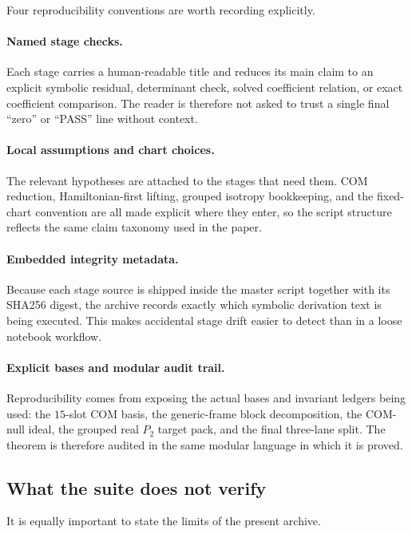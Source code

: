 \documentclass[11pt]{article}
\begin{document}
Four reproducibility conventions are worth recording explicitly.

\paragraph{Named stage checks.}
Each stage carries a human-readable title and reduces its main claim to an
explicit symbolic residual, determinant check, solved coefficient relation, or
exact coefficient comparison.  The reader is therefore not asked to trust a
single final ``zero'' or ``PASS'' line without context.

\paragraph{Local assumptions and chart choices.}
The relevant hypotheses are attached to the stages that need them.  COM
reduction, Hamiltonian-first lifting, grouped isotropy bookkeeping, and the
fixed-chart convention are all made explicit where they enter, so the script
structure reflects the same claim taxonomy used in the paper.

\paragraph{Embedded integrity metadata.}
Because each stage source is shipped inside the master script together with its
SHA256 digest, the archive records exactly which symbolic derivation text is
being executed.  This makes accidental stage drift easier to detect than in a
loose notebook workflow.

\paragraph{Explicit bases and modular audit trail.}
Reproducibility comes from exposing the actual bases and invariant ledgers being
used: the $15$-slot COM basis, the generic-frame block decomposition, the
COM-null ideal, the grouped real $P_2$ target pack, and the final three-lane
split.  The theorem is therefore audited in the same modular language in which
it is proved.

\subsection{What the suite does not verify}
\label{sec:verification-does-not}

It is equally important to state the limits of the present archive.
\end{document}
